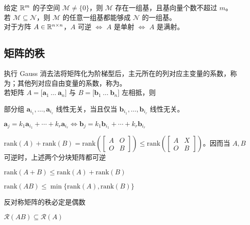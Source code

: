 \documentclass[./main.tex]{subfiles}
\begin{document}
给定 $\mathbb{R}^{m}$ 的子空间 $\mathcal{M}\neq\{0\}$，则 $\mathcal{M}$ 存在一组基，且基向量个数不超过 $m$。\\

若 $\mathcal{M}\subseteq\mathcal{N}$，则 $\mathcal{M}$ 的任意一组基都能够成 $\mathcal{N}$ 的一组基。\\

对于方阵 $A\in\mathbb{R}^{n\times n}$，$A$ 可逆 $\iff$ $A$ 是单射 $\iff$ $A$ 是满射。

\subsection{矩阵的秩}
执行 Gauss 消去法将矩阵化为阶梯型后，主元所在的列对应主变量的系数，称为；其他列对应自由变量的系数，称为。\\

若矩阵 $A=\big[\bm{a}_1\ \dots\ \bm{a}_n\big]$ 与 $B=\big[\bm{b}_1\ \dots\ \bm{b}_n\big]$ 左相抵，则

\begin{enumerate*}
    \item 部分组 $\bm{a}_{i_1},\dots,\bm{a}_{i_r}$ 线性无关，当且仅当 $\bm{b}_{i_1},\dots,\bm{b}_{i_r}$ 线性无关。
    \item $\bm{a}_j=k_1\bm{a}_{i_1}+\cdots+k_r\bm{a}_{i_r}\iff\bm{b}_j=k_1\bm{b}_{i_1}+\cdots+k_r\bm{b}_{i_r}$
\end{enumerate*}

\begin{itemize*}
    \item $\mathrm{rank}(A)+\mathrm{rank}(B)=\mathrm{rank}\left(\begin{bmatrix}A &O\\ O &B\end{bmatrix}\right)\le\mathrm{rank}\left(\begin{bmatrix}A &X\\ O &B\end{bmatrix}\right)$。因而当 $A,B$ 可逆时，上述两个分块矩阵都可逆
    \item $\mathrm{rank}(A+B)\le\mathrm{rank}(A)+\mathrm{rank}(B)$
    \item $\mathrm{rank}(AB)\le\min\{\mathrm{rank}(A),\mathrm{rank}(B)\}$
    \item 反对称矩阵的秩必定是偶数
    \item $\mathcal{R}(AB)\subseteq\mathcal{R}(A)$
\end{itemize*}
\end{document}
